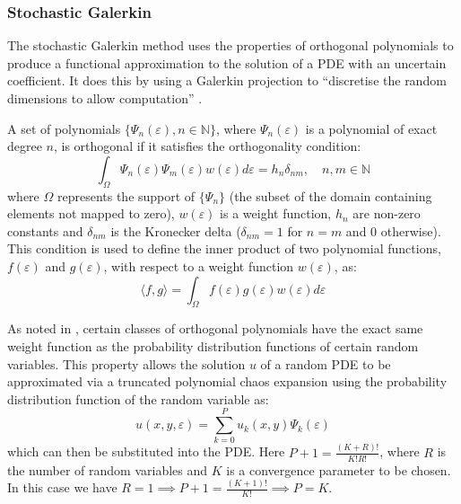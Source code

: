 \documentclass[11pt]{article}
\numberwithin{equation}{section}
\begin{document}
\subsubsection{Stochastic Galerkin}
The stochastic Galerkin method uses the properties of orthogonal polynomials to produce a functional approximation to the solution of a PDE with an uncertain coefficient. It does this by using a Galerkin projection to ``discretise the random dimensions to allow computation'' \cite{Paul}. 

A set of polynomials $\{\Psi_n(\varepsilon), n \in \mathbb{N}\}$, where $\Psi_n(\varepsilon)$ is a polynomial of exact degree $n$, is orthogonal if it satisfies the orthogonality condition:
\begin{equation}
\int_{\Omega} \Psi_n(\varepsilon) \Psi_m(\varepsilon) w(\varepsilon) d\varepsilon = h_n \delta_{nm}, \quad n,m \in \mathbb{N}
\end{equation} 
where $\Omega$ represents the support of $\{\Psi_n\}$ (the subset of the domain containing elements not mapped to zero), $w(\varepsilon)$ is a weight function, $h_n$ are non-zero constants and $\delta_{nm}$ is the Kronecker delta ($\delta_{nm} = 1$ for $n=m$ and $0$ otherwise). This condition is used to define the inner product of two polynomial functions, $f(\varepsilon)$ and $g(\varepsilon)$, with respect to a weight function $w(\varepsilon)$, as:
\begin{equation}
\langle f, g \rangle = \int_{\Omega} f(\varepsilon)g(\varepsilon)w(\varepsilon) d\varepsilon
\end{equation}

As noted in \cite{Xiu}, certain classes of orthogonal polynomials have the exact same weight function as the probability distribution functions of certain random variables. This property allows the solution $u$ of a random PDE to be approximated via a truncated polynomial chaos expansion using the probability distribution function of the random variable as:
\begin{equation}
u(x,y,\varepsilon) = \sum_{k=0}^P u_k(x,y) \Psi_k(\varepsilon)
\end{equation}
which can then be substituted into the PDE. Here $P+1 = \frac{(K+R)!}{K!R!}$, where $R$ is the number of random variables and $K$ is a convergence parameter to be chosen. In this case we have $R=1 \implies P+1=\frac{(K+1)!}{K!}\implies P=K$.

\end{document}
